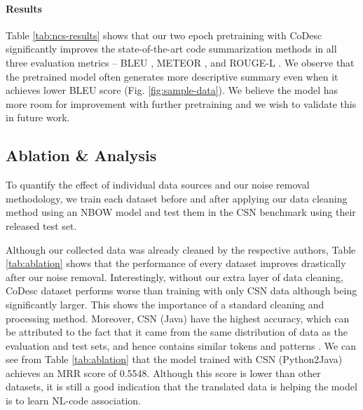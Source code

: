 \documentclass[11pt,a4paper]{article}
\begin{document}
\paragraph{Results} 
Table \ref{tab:ncs-results} shows that our two epoch pretraining with CoDesc significantly improves the state-of-the-art code summarization methods in all three evaluation metrics -- BLEU \cite{bleu}, METEOR \cite{meteor}, and ROUGE-L \cite{rouge}. We observe that the pretrained model often generates more descriptive summary even when it achieves lower BLEU score (Fig. \ref{fig:sample-data}).
We believe the model has more room for improvement with further pretraining and we wish to validate this in future work.



\subsection{Ablation \& Analysis}

To quantify the effect of individual data sources and our noise removal methodology, we train each dataset before and after applying our data cleaning method using an NBOW model and test them in the CSN benchmark using their released test set.

Although our collected data was already cleaned by the respective authors, Table \ref{tab:ablation} shows that the performance of every dataset improves drastically after our noise removal. Interestingly, without our extra layer of data cleaning, CoDesc dataset performs worse than training with only CSN data although being significantly larger. This shows the importance of a standard cleaning and processing method. Moreover, CSN (Java) have the highest accuracy, which can be attributed to the fact that it came from the same distribution of data as the evaluation and test sets, and hence contains similar tokens and patterns \cite{husain2019codesearchnet}. We can see from Table \ref{tab:ablation} that the model trained with CSN (Python2Java) achieves an MRR score of 0.5548. Although this score is lower than other datasets, it is still a good indication that the translated data is helping the model is to learn NL-code association.
\end{document}
